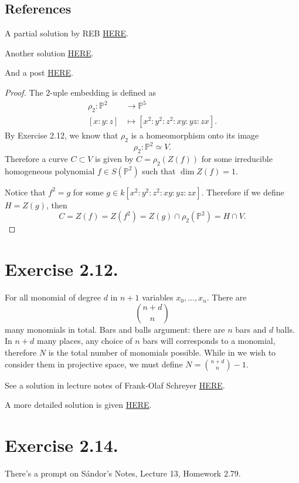 \subsection{References}

A partial solution by REB \href{https://math.berkeley.edu/~reb/courses/256A/1.2.pdf}{HERE}.

Another solution \href{http://mcs.unife.it/alex.massarenti/files/exag1.pdf}{HERE}.

And a post \href{https://math.stackexchange.com/questions/550816/why-this-property-holds-in-a-veronese-surface}{HERE}.

\begin{proof}
    The $2$-uple embedding is defined as 
    \begin{align*}
        \rho_2:\mathbb P^2 &\to\mathbb P^5\\
         [x:y:z] &\mapsto[x^2:y^2:z^2:xy:yz:zx].
    \end{align*}
    By Exercise 2.12, we know that $\rho_2$ is a homeomorphism onto its image \[\rho_2:\mathbb P^2\simeq V.\] Therefore a curve $C\subset V$ is given by 
    $C=\rho_2(Z(f))$ for some irreducible homogeneous polynomial $f\in S(\mathbb P^2)$ such that $\operatorname{dim}Z(f)=1$.


    Notice that $f^2=g$ for some $g\in k[x^2:y^2:z^2:xy:yz:zx]$. Therefore if we define $H=Z(g)$, then
    \[C=Z(f)=Z(f^2)=Z(g)\cap \rho_2(\mathbb P^2)=H\cap V.\]

\end{proof}


\section{Exercise 2.12.}

For all monomial of degree $d$ in $n+1$ variables $x_0,...,x_n$. 
There are \[\binom{n+d}{n}\] many monomials in total. Bars and balls argument: there are $n$ bars and $d$ balls. In $n+d$ many places, any choice of $n$ bars will corresponds to a monomial, therefore $N$ is the total number of monomials possible. While in we wish to consider them in projective space, we must define $N=\binom{n+d}{n}-1$.

See a solution in lecture notes of Frank-Olaf Schreyer \href{https://www.math.uni-sb.de/ag/schreyer/images/PDFs/teaching/ss21_perugia/AlgGeomSlides19.pdf}{HERE}.

A more detailed solution is given \href{http://therisingsea.org/notes/hartshorne1-2.pdf}{HERE}.

\section{Exercise 2.14.}

There's a prompt on S\'andor's Notes, Lecture 13, Homework 2.79.